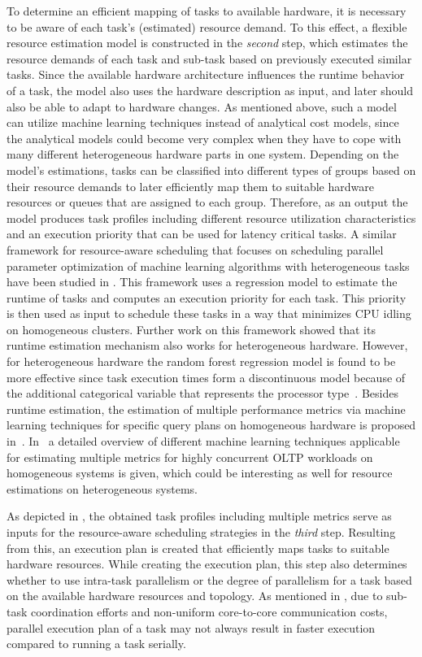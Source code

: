 \documentclass[11pt]{article}
\begin{document}
To determine an efficient mapping of tasks to available hardware,
it is necessary to be aware of each task’s (estimated) resource demand.
To this effect, a flexible resource estimation model is constructed in the \textit{second} step,
which estimates the resource demands of each task and sub-task based on previously executed similar tasks.
Since the available hardware architecture influences the runtime behavior of a task,
the model also uses the hardware description as input,
and later should also be able to adapt to hardware changes.
As mentioned above,
such a model can utilize machine learning techniques instead of analytical cost models,
since the analytical models could become very complex
when they have to cope with many different heterogeneous hardware parts in one system.
Depending on the model's estimations,
tasks can be classified into different types of groups based on their resource demands
to later efficiently map them to suitable hardware resources or queues that are assigned to each group.
Therefore, as an output the model produces task profiles
including different resource utilization characteristics and
an execution priority that can be used for latency critical tasks. 
A similar framework for resource-aware scheduling that focuses on scheduling
parallel parameter optimization of machine learning algorithms with heterogeneous tasks
have been studied in \cite{kotthaus_2017a}.
This framework uses a regression model to estimate the runtime of tasks
and computes an execution priority for each task.
This priority is then used as input to schedule these tasks
in a way that minimizes CPU idling on homogeneous clusters.
Further work on this framework showed that its runtime estimation mechanism also works for heterogeneous hardware.
However, for heterogeneous hardware the random forest regression model is found to be more effective since
task execution times form a discontinuous model
because of the additional categorical variable that represents the processor type~\cite{kotthaus_2018}. 
Besides runtime estimation,
the estimation of multiple performance metrics via machine learning techniques
for specific query plans on homogeneous hardware is proposed in~\cite{Ganapathi_2009}.
In~\cite{Mozafari_2013} a detailed overview of different machine learning techniques applicable for estimating multiple metrics for highly concurrent OLTP workloads on homogeneous systems is given, which could be interesting as well for resource estimations on heterogeneous systems. 

As depicted in ,
the obtained task profiles including multiple metrics serve as inputs for the resource-aware scheduling strategies
in the \textit{third} step.
Resulting from this, an execution plan is created that efficiently maps tasks to suitable hardware resources.
While creating the execution plan, this step also determines whether to use intra-task parallelism or
the degree of parallelism for a task based on the available hardware resources and topology.
As mentioned in , due to sub-task coordination efforts and non-uniform core-to-core communication costs,
parallel execution plan of a task may not always result in faster execution compared to running a task serially.
\end{document}
